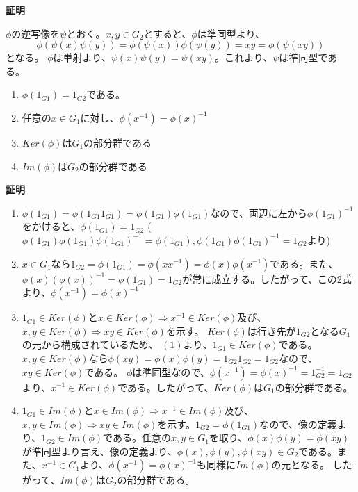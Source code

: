 \documentclass[dvipdfmx,autodetect-engine]{jsarticle}
\begin{document}
\label{prop:isomorphic}

{\bf 証明}

$\phi$の逆写像を$\psi$とおく。$x, y \in G_2$とすると、$\phi$は準同型より、
$$
\phi(\psi(x)\psi(y)) = \phi(\psi(x))\phi(\psi(y)) = xy = \phi(\psi(xy))
$$
となる。
$\phi$は単射より、$\psi(x)\psi(y) = \psi(xy)$。これより、$\psi$は準同型である。


\label{prop:homomorphism}

\begin{enumerate}
\renewcommand{\labelenumi}{(\arabic{enumi})}
\item $\phi(1_{G1}) = 1_{G2}$である。
\item 任意の$x \in G_1$に対し、$\phi(x^{-1}) = \phi(x)^{-1}$
\item $Ker(\phi)$は$G_1$の部分群である
\item $Im(\phi)$は$G_2$の部分群である
\end{enumerate}

{\bf 証明}
\begin{enumerate}
\renewcommand{\labelenumi}{(\arabic{enumi})}
\item $\phi(1_{G1}) = \phi(1_{G1} 1_{G1}) = \phi(1_{G1})\phi(1_{G1})$なので、両辺に左から$\phi(1_{G1})^{-1}$をかけると、$\phi(1_{G1}) = 1_{G2}$ ($\phi(1_{G1})\phi(1_{G1})\phi(1_{G1})^{-1} = \phi(1_{G1}), \phi(1_{G1})\phi(1_{G1})^{-1} = 1_{G2}$より)

\item $x \in G_1$なら$1_{G2} = \phi(1_{G1}) = \phi(xx^{-1}) = \phi(x)\phi(x^{-1})$である。また、$\phi(x)(\phi(x))^{-1} = \phi(1_{G1}) = 1_{G2}$が常に成立する。したがって、この2式より、$\phi(x^{-1}) = \phi(x)^{-1}$

\item $1_{G1} \in Ker(\phi)$と$x \in Ker(\phi) \Rightarrow x^{-1} \in Ker(\phi)$及び、$x, y \in Ker(\phi) \Rightarrow xy \in Ker(\phi)$を示す。
$Ker(\phi)$は行き先が$1_{G2}$となる$G_1$の元から構成されているため、 $(1)より、1_{G1} \in Ker(\phi)$である。$x, y \in Ker(\phi)$なら$\phi(xy) = \phi(x)\phi(y) = 1_{G2}1_{G2} = 1_{G2}$なので、$xy \in Ker(\phi)$である。
$\phi$は準同型なので、$\phi(x^{-1}) = \phi(x)^{-1} = 1_{G2}^{-1} = 1_{G2}$より、$x^{-1} \in Ker(\phi)$である。したがって、$Ker(\phi)$は$G_1$の部分群である。

\item $1_{G1} \in Im(\phi)$と$x \in Im(\phi) \Rightarrow x^{-1} \in Im(\phi)$及び、$x, y \in Im(\phi) \Rightarrow xy \in Im(\phi)$を示す。$1_{G2} = \phi(1_{G1})$なので、像の定義より、$1_{G2} \in Im(\phi)$である。任意の$x, y \in G_1$を取り、$\phi(x)\phi(y) = \phi(xy)$が準同型より言え、像の定義より、$\phi(x), \phi(y), \phi(xy) \in G_2$である。また、$x^{-1} \in G_1$より、$\phi(x^{-1}) = \phi(x)^{-1}$も同様に$Im(\phi)$の元となる。 したがって、$Im(\phi)$は$G_2$の部分群である。
\end{enumerate}
\end{document}
